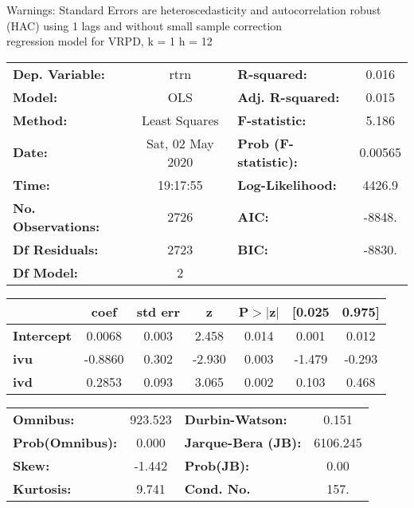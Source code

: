 Warnings: \newline
 [1] Standard Errors are heteroscedasticity and autocorrelation robust (HAC) using 1 lags and without small sample correction\\ 

regression model for VRPD, k = 1 h = 12\begin{center}
\begin{tabular}{lclc}
\toprule
\textbf{Dep. Variable:}    &       rtrn       & \textbf{  R-squared:         } &     0.016   \\
\textbf{Model:}            &       OLS        & \textbf{  Adj. R-squared:    } &     0.015   \\
\textbf{Method:}           &  Least Squares   & \textbf{  F-statistic:       } &     5.186   \\
\textbf{Date:}             & Sat, 02 May 2020 & \textbf{  Prob (F-statistic):} &  0.00565    \\
\textbf{Time:}             &     19:17:55     & \textbf{  Log-Likelihood:    } &    4426.9   \\
\textbf{No. Observations:} &        2726      & \textbf{  AIC:               } &    -8848.   \\
\textbf{Df Residuals:}     &        2723      & \textbf{  BIC:               } &    -8830.   \\
\textbf{Df Model:}         &           2      & \textbf{                     } &             \\
\bottomrule
\end{tabular}
\begin{tabular}{lcccccc}
                   & \textbf{coef} & \textbf{std err} & \textbf{z} & \textbf{P$> |$z$|$} & \textbf{[0.025} & \textbf{0.975]}  \\
\midrule
\textbf{Intercept} &       0.0068  &        0.003     &     2.458  &         0.014        &        0.001    &        0.012     \\
\textbf{ivu}       &      -0.8860  &        0.302     &    -2.930  &         0.003        &       -1.479    &       -0.293     \\
\textbf{ivd}       &       0.2853  &        0.093     &     3.065  &         0.002        &        0.103    &        0.468     \\
\bottomrule
\end{tabular}
\begin{tabular}{lclc}
\textbf{Omnibus:}       & 923.523 & \textbf{  Durbin-Watson:     } &    0.151  \\
\textbf{Prob(Omnibus):} &   0.000 & \textbf{  Jarque-Bera (JB):  } & 6106.245  \\
\textbf{Skew:}          &  -1.442 & \textbf{  Prob(JB):          } &     0.00  \\
\textbf{Kurtosis:}      &   9.741 & \textbf{  Cond. No.          } &     157.  \\
\bottomrule
\end{tabular}
\end{center}

